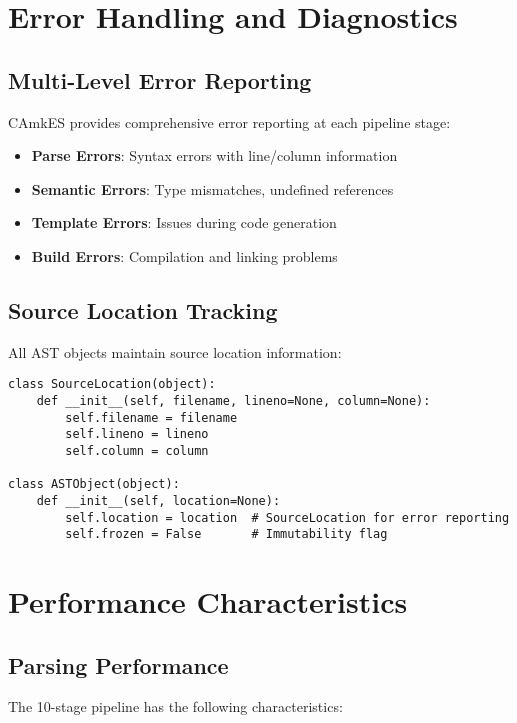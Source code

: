 \documentclass[12pt,a4paper]{article}
\begin{document}
\section{Error Handling and Diagnostics}

\subsection{Multi-Level Error Reporting}
CAmkES provides comprehensive error reporting at each pipeline stage:

\begin{itemize}
    \item \textbf{Parse Errors}: Syntax errors with line/column information
    \item \textbf{Semantic Errors}: Type mismatches, undefined references
    \item \textbf{Template Errors}: Issues during code generation
    \item \textbf{Build Errors}: Compilation and linking problems
\end{itemize}

\subsection{Source Location Tracking}
All AST objects maintain source location information:


\begin{lstlisting}[style=python]
class SourceLocation(object):
    def __init__(self, filename, lineno=None, column=None):
        self.filename = filename
        self.lineno = lineno  
        self.column = column
        
class ASTObject(object):
    def __init__(self, location=None):
        self.location = location  # SourceLocation for error reporting
        self.frozen = False       # Immutability flag
\end{lstlisting}

\section{Performance Characteristics}

\subsection{Parsing Performance}
The 10-stage pipeline has the following characteristics:
\end{document}
